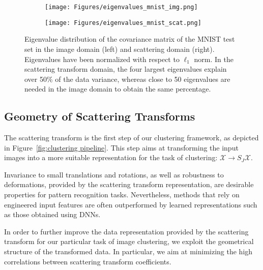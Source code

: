 \documentclass[11pt]{article}
\theoremstyle{definition}
\newcommand{\ImageDataset}{\mathcal{X}}
\newcommand{\ScatteringFeatures}{S_J\mathcal{X}}
\newcommand{\Figure}[1]{Figure~\ref{#1}}
\begin{document}
\begin{figure}[b]	
	\hspace{0.05\textwidth}
	\begin{subfigure}{0.3\textwidth}
		\hspace*{0\textwidth}
\texttt{[image: Figures/eigenvalues\_mnist\_img.png]}
		\label{fig:subfig1}
	\end{subfigure}
	\hspace{0.15\textwidth}
	\begin{subfigure}{0.3\textwidth}
		\centering
		\texttt{[image: Figures/eigenvalues\_mnist\_scat.png]}
		\label{fig:subfig2}
	\end{subfigure}
	\hspace{0.1\textwidth}
	\vspace{-0.7cm}
	\caption{Eigenvalue distribution of the covariance matrix of the MNIST test set in the image domain (left) and scattering domain (right). Eigenvalues have been normalized with respect to $\ell_1$ norm. In the scattering transform domain, the four largest eigenvalues explain over 50\% of the data variance, whereas close to 50 eigenvalues are needed in the image domain to obtain the same percentage.}
	\label{fig:eigenvalues mnist dataset}
\end{figure}


\subsection{Geometry of Scattering Transforms}\label{sec:Geometry of Scattering Transforms}

The scattering transform is the first step of our clustering framework, as depicted in \Figure{fig:clustering pipeline}. This step aims at transforming the input images into a more suitable representation for the task of clustering: $\ImageDataset \rightarrow \ScatteringFeatures$. 


Invariance to small translations and rotations, as well as robustness to deformations, provided by the scattering transform representation, are desirable properties for pattern recognition tasks. Nevertheless, methods that rely on engineered input features are often outperformed by learned representations such as those obtained using DNNs.


In order to further improve the data representation provided by the scattering transform for our particular task of image clustering, we exploit the geometrical structure of the transformed data. In particular, we aim at minimizing the high correlations between scattering transform coefficients.
\end{document}
